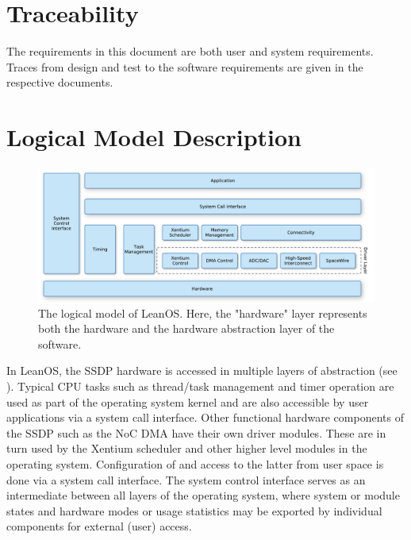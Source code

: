 

\chapter{Traceability}

The requirements in this document are both user and system requirements.
Traces from design and test to the software requirements are given in the
respective documents. \cite{leanosADD} \cite{leanosTS}


\chapter{Logical Model Description}

\begin{figure}[htb]
\begin{center}
	\includegraphics[width=\columnwidth]{images/OS_logical}
	\caption{The logical model of LeanOS. Here, the "hardware" layer
	represents both the hardware and the hardware abstraction layer of
	the software.}
	\label{fig:logical_model}
\end{center}
\end{figure}

In LeanOS, the \gls{SSDP} hardware is accessed in multiple layers of
abstraction (see ). Typical \gls{CPU} tasks such as thread/task
management and timer operation are used as part of the operating system kernel
and are also accessible by user applications via a system call interface.
Other functional hardware components of the \gls{SSDP} such as the \gls{NoC}
\gls{DMA} have their own driver modules. These are in turn used by the
\gls{Xentium} scheduler and other higher level modules in the operating system.
Configuration of and access to the latter from user space is done via a system
call interface. The system control interface serves as an intermediate between
all layers of the operating system, where system or module states and hardware
modes or usage statistics may be exported by individual components for external
(user) access.






